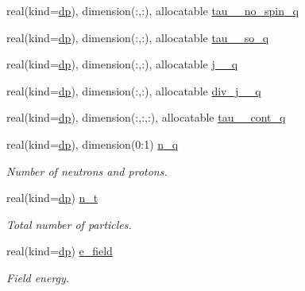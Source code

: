 \begin{DoxyCompactItemize}
\item 
real(kind=\mbox{\hyperlink{namespaceparameters_a52f8c6351fd79345d8811e065bcbbb37}{dp}}), dimension(\+:,\+:), allocatable \mbox{\hyperlink{namespaceparameters_a6722d1e0c27f2796d4e43405bd9c9d81}{tau\+\_\+\_\+no\+\_\+spin\+\_\+q}}
\item 
real(kind=\mbox{\hyperlink{namespaceparameters_a52f8c6351fd79345d8811e065bcbbb37}{dp}}), dimension(\+:,\+:), allocatable \mbox{\hyperlink{namespaceparameters_a6f95c2f318204d32f47cefa370021fe4}{tau\+\_\+\_\+so\+\_\+q}}
\item 
real(kind=\mbox{\hyperlink{namespaceparameters_a52f8c6351fd79345d8811e065bcbbb37}{dp}}), dimension(\+:,\+:), allocatable \mbox{\hyperlink{namespaceparameters_a41689cc1fc405b2fd02236c39ee5528c}{j\+\_\+\_\+q}}
\item 
real(kind=\mbox{\hyperlink{namespaceparameters_a52f8c6351fd79345d8811e065bcbbb37}{dp}}), dimension(\+:,\+:), allocatable \mbox{\hyperlink{namespaceparameters_ab8757a22096c3d5f05f0bf953b59dff4}{div\+\_\+j\+\_\+\_\+q}}
\item 
real(kind=\mbox{\hyperlink{namespaceparameters_a52f8c6351fd79345d8811e065bcbbb37}{dp}}), dimension(\+:,\+:,\+:), allocatable \mbox{\hyperlink{namespaceparameters_a1dd9d0c60fab7b85157b61471151ed92}{tau\+\_\+\_\+cont\+\_\+q}}
\item 
real(kind=\mbox{\hyperlink{namespaceparameters_a52f8c6351fd79345d8811e065bcbbb37}{dp}}), dimension(0\+:1) \mbox{\hyperlink{group__WS__PROPERTIES_gace169ff7d198e04f282498a2b0ee2bc1}{n\+\_\+q}}
\begin{DoxyCompactList}\small\item\em Number of neutrons and protons. \end{DoxyCompactList}\item 
real(kind=\mbox{\hyperlink{namespaceparameters_a52f8c6351fd79345d8811e065bcbbb37}{dp}}) \mbox{\hyperlink{group__WS__PROPERTIES_ga4ea79549c467085cd4c8b95a09ac205e}{n\+\_\+t}}
\begin{DoxyCompactList}\small\item\em Total number of particles. \end{DoxyCompactList}\item 
real(kind=\mbox{\hyperlink{namespaceparameters_a52f8c6351fd79345d8811e065bcbbb37}{dp}}) \mbox{\hyperlink{group__WS__PROPERTIES_gaba6452c229b473b375ee695573482098}{e\+\_\+field}}
\begin{DoxyCompactList}\small\item\em Field energy. \end{DoxyCompactList}\item 

\end{DoxyCompactItemize}
